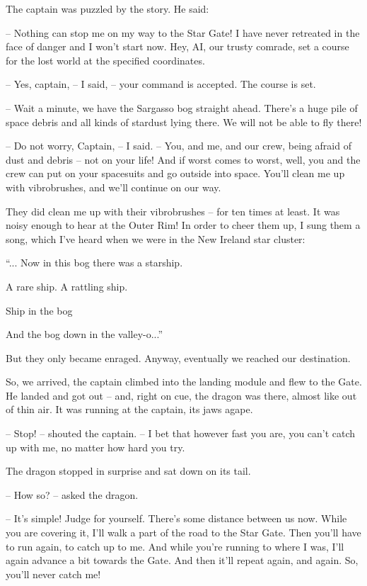 \documentclass[ebook,oneside,final,openright]{memoir}
\begin{document}
\par
The captain was puzzled by the story. He said:\par
– Nothing can stop me on my way to the Star Gate! I have never retreated in the face of danger and I won’t start now. Hey, AI, our trusty comrade, set a course for the lost world at the specified coordinates.\par
– Yes, captain, – I said, – your command is accepted. The course is set.\par
– Wait a minute, we have the Sargasso bog straight ahead. There’s a huge pile of space debris and all kinds of stardust lying there. We will not be able to fly there!\par
– Do not worry, Captain, – I said. – You, and me, and our crew, being afraid of dust and debris – not on your life! And if worst comes to worst, well, you and the crew can put on your spacesuits and go outside into space. You’ll clean me up with vibrobrushes, and we’ll continue on our way.\par
\par
They did clean me up with their vibrobrushes – for ten times at least. It was noisy enough to hear at the Outer Rim! In order to cheer them up, I sung them a song, which I’ve heard when we were in the New Ireland star cluster: \par
“... Now in this bog there was a starship.\par
A rare ship. A rattling ship.\par
Ship in the bog\par
And the bog down in the valley-o...”\par
 But they only became enraged. Anyway, eventually we reached our destination.\par
\par
So, we arrived, the captain climbed into the landing module and flew to the Gate. He landed and got out – and, right on cue, the dragon was there, almost like out of thin air. It was running at the captain, its jaws agape.\par
– Stop! – shouted the captain. – I bet that however fast you are, you can’t catch up with me, no matter how hard you try.\par
The dragon stopped in surprise and sat down on its tail.\par
– How so? – asked the dragon.\par
– It’s simple! Judge for yourself. There’s some distance between us now. While you are covering it, I’ll walk a part of the road to the Star Gate. Then you’ll have to run again, to catch up to me. And while you’re running to where I was, I’ll again advance a bit towards the Gate. And then it’ll repeat again, and again. So, you’ll never catch me!\par
\end{document}

